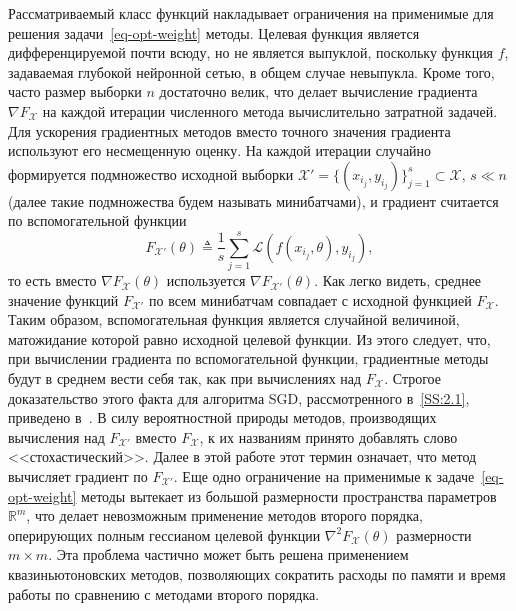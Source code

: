 \documentclass[preprint,12pt]{elsarticle}
\begin{document}
Рассматриваемый класс функций накладывает ограничения на применимые для решения задачи~\eqref{eq-opt-weight} методы. 
Целевая функция является дифференцируемой почти всюду, но не является выпуклой, поскольку функция $f$, задаваемая глубокой нейронной сетью, в общем случае невыпукла. 
Кроме того, часто размер выборки $n$ достаточно велик, что делает вычисление градиента $\nabla F_\mathcal{X}$ на каждой итерации численного метода вычислительно затратной задачей. 
Для ускорения градиентных методов вместо точного значения градиента используют его несмещенную оценку.
На каждой итерации случайно формируется подмножество исходной выборки $\mathcal{X}' = \{(x_{i_j}, y_{i_j})\}_{j=1}^s \subset \mathcal{X}, \, s \ll n$ (далее такие подмножества будем называть минибатчами), и градиент считается по вспомогательной функции 
\begin{equation}
    F_{\mathcal{X}'}(\theta) \triangleq \frac1s \sum_{j=1}^s \mathcal{L}(f(x_{i_j}, \theta), y_{i_j}),
\end{equation} 
то есть вместо $\nabla F_\mathcal{X}(\theta)$ используется $\nabla F_{\mathcal{X}'}(\theta)$. Как легко видеть, среднее значение функций $F_{\mathcal{X}'}$ по всем минибатчам совпадает с исходной функцией $F_\mathcal{X}$. 
Таким образом, вспомогательная функция является случайной величиной, матожидание которой равно исходной целевой функции. 
Из этого следует, что, при вычислении градиента по вспомогательной функции, градиентные методы будут в среднем вести себя так, как при вычислениях над $F_\mathcal{X}$. 
Строгое доказательство этого факта для алгоритма SGD, рассмотренного в~\ref{SS:2.1}, приведено в~\cite{SGDconvergence}.
В силу вероятностной природы методов, производящих вычисления над $F_{\mathcal{X}'}$ вместо $F_\mathcal{X}$, к их названиям принято добавлять слово <<стохастический>>. Далее в этой работе этот термин означает, что метод вычисляет градиент по $F_{\mathcal{X}'}$. 
Еще одно ограничение на применимые к задаче~\eqref{eq-opt-weight} методы вытекает из большой размерности пространства параметров $\mathbb{R}^m$, что делает невозможным применение методов второго порядка, оперирующих полным гессианом целевой функции $\nabla^2 F_\mathcal{X}(\theta)$ размерности $m \times m$. 
Эта проблема частично может быть решена применением квазиньютоновских методов, позволяющих сократить расходы по памяти и время работы по сравнению с методами второго порядка.
\end{document}
